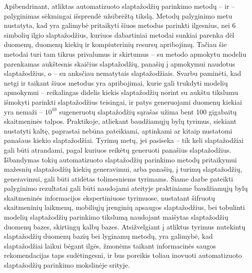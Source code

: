 \documentclass{VUMIFInfBakalaurinis}
\begin{document}
Apibendrinant, atliktas automatizuoto slaptažodžių parinkimo metodų -- 
 ir  -- palyginimas sėkmingai išsprendė 
užsibrėžtą tikslą. Metodų palyginimo metu nustatyta, kad yra galimybė pritaikyti
šiuos metodus parinkti ilgesnius, nei 6 simbolių ilgio slaptažodžius, kuriuos 
dabartiniai metodai sunkiai parenka dėl duomenų, duomenų kiekių ir kompiuterinių 
resursų apribojimų. Tačiau šie metodai turi tam tikrus privalumus ir skirtumus 
-- su  metodo apmokytu modeliu parenkamas aukštesnis skaičius 
slaptažodžių, panašių į apmokymui naudotus slaptažodžius, o  
-- su anksčiau nematytais slaptažodžiais. Svarbu paminėti, kad netgi ir taikant 
šiuos metodus yra apribojimai, kurie gali trukdyti modelių apmokymui -- 
reikalingas didelis kiekis slaptažodžių norint su aukštu tikslumu išmokyti 
parinkti slaptažodžius teisingai, ir patys generuojami duomenų kiekiai yra 
nemaži -- $10^{10}$ sugeneruotų slaptažodžių sąrašas užima bent 100 gigabaitų 
skaitmeninės talpos. Praktikoje, atliekant baudžiamųjų bylų tyrimus, siekiant 
nustatyti kaltę, paprastai nebūna pateikiami, aptinkami ar kitaip nustatomi 
panašaus kiekio slaptažodžiai. Tyrimų metų, jei pasiseka -- tik keli 
slaptažodžiai gali būti atrandami, pagal kuriuos reikėtų generuoti panašius 
slaptažodžius. Išbandymas tokių automatizuoto slaptažodžių parinkimo metodų 
pritaikymui mažesnių slaptažodžių kiekių generavimui, arba panašių, į turimų 
slaptažodžių, generavimui, gali būti atidėtas tolimesniems tyrimams. Šiame darbe 
pateikti palyginimo rezultatai gali būti naudojami ateityje praktiniame 
baudžiamųjų bylų skaitmeninės informacijos ekspertiniuose tyrimuose, nustatant 
šifruotų skaitmeninių laikmenų, mobiliųjų įrenginių apsaugos slaptažodžius, bei 
tobulinti modelių slaptažodžių parinkimo tikslumą naudojant maišytas 
slaptažodžių duomenų bazes, skirtingų kalbų bazes. Atsižvelgiant į atliktus 
tyrimus nutekintų slaptažodžių duomenų bazių bei lyginamų metodų, yra galimybė, 
kad slaptažodžiai laikui bėgant ilgės, žmonėms taikant informacinės saugos 
rekomendacijas taps sudėtingesni, ir bus poreikis toliau inovuoti automatizuoto 
slaptažodžių parinkimo mokslinėje srityje.
\end{document}
